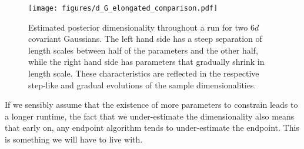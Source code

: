\documentclass[usenatbib]{mnras}
\begin{document}
\begin{figure}
\begin{center}
    \texttt{[image: figures/d\_G\_elongated\_comparison.pdf]}
\end{center}
\caption{Estimated posterior dimensionality throughout a run for two 6$d$ covariant Gaussians. The left hand side has a steep separation of length scales between half of the parameters and the other half, while the right hand side has parameters that gradually shrink in length scale. These characteristics are reflected in the respective step-like and gradual evolutions of the sample dimensionalities.}
\label{fig:d_G_elongated_comparison}
\end{figure}
\par
If we sensibly assume that the existence of more parameters to constrain leads to a longer runtime, the fact that we under-estimate the dimensionality also means that early on, any endpoint algorithm tends to under-estimate the endpoint. This is something we will have to live with.
\end{document}
